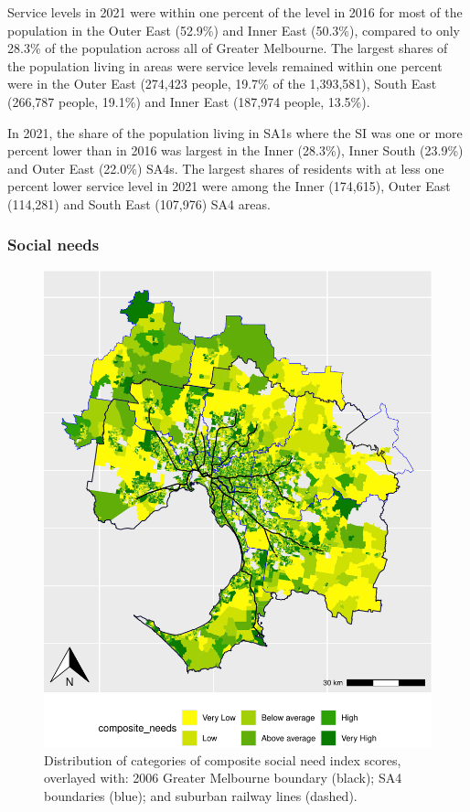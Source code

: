 \documentclass[preprint, 3p,
authoryear]{elsarticle} %
\begin{document}
Service levels in 2021 were within one percent of the level in 2016 for
most of the population in the Outer East (52.9\%) and Inner East
(50.3\%), compared to only 28.3\% of the population across all of
Greater Melbourne. The largest shares of the population living in areas
were service levels remained within one percent were in the Outer East
(274,423 people, 19.7\% of the 1,393,581), South East (266,787 people,
19.1\%) and Inner East (187,974 people, 13.5\%).

In 2021, the share of the population living in SA1s where the SI was one
or more percent lower than in 2016 was largest in the Inner (28.3\%),
Inner South (23.9\%) and Outer East (22.0\%) SA4s. The largest shares of
residents with at less one percent lower service level in 2021 were
among the Inner (174,615), Outer East (114,281) and South East (107,976)
SA4 areas.

\hypertarget{social-needs}{%
\subsubsection{Social needs}\label{social-needs}}

\begin{figure}
\centering
\includegraphics{ReynoldsCurrieQu2024_files/figure-latex/Greater_Melbourne_2021_social_needs-1.pdf}
\caption{Distribution of categories of composite social need index
scores, overlayed with: 2006 Greater Melbourne boundary (black); SA4
boundaries (blue); and suburban railway lines (dashed).}
\end{figure}
\end{document}
